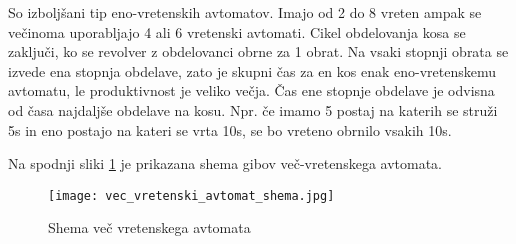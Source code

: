 So izboljšani tip eno-vretenskih avtomatov. Imajo od
2 do 8 vreten ampak se večinoma uporabljajo 4 ali 6
vretenski avtomati. Cikel obdelovanja kosa se zaključi,
ko se revolver z obdelovanci obrne za 1 obrat. Na vsaki stopnji
obrata se izvede ena stopnja obdelave, zato je skupni čas za en
kos enak eno-vretenskemu avtomatu, le produktivnost je veliko
večja. Čas ene stopnje obdelave je odvisna od časa najdaljše
obdelave na kosu. Npr. če imamo 5 postaj na katerih se struži 5s
in eno postajo na kateri se vrta 10s, se bo vreteno obrnilo vsakih 10s.

Na spodnji sliki \ref{vec_vretenc} je prikazana shema gibov več-vretenskega
avtomata.

\begin{figure}[H]
	\begin{center}
		\texttt{[image: vec\_vretenski\_avtomat\_shema.jpg]}
		\caption{Shema več vretenskega avtomata
			\cite{vec_vretenska_struznica_shema}}
		\label{vec_vretenc}
	\end{center}
\end{figure}